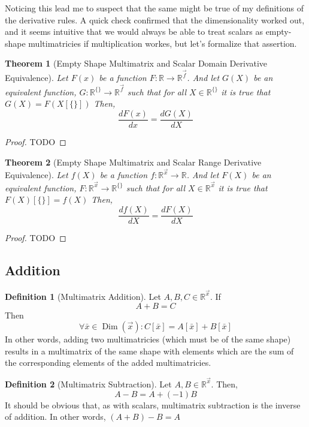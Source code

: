 \documentclass[12pt]{article}
\theoremstyle{definition}
\newtheorem{definition}{Definition}[section]
\theoremstyle{plain}
\newtheorem{theorem}{Theorem}[section]
\theoremstyle{ppart}
\DeclareMathOperator{\Dim}{Dim}
\begin{document}
Noticing this lead me to suspect that the same might be true of my definitions
of the derivative rules. A quick check confirmed that the dimensionality
worked out, and it seems intuitive that we would always be able to treat scalars
as empty-shape multimatricies if multiplication workes, but let's formalize that
assertion.

\begin{theorem}[Empty Shape Multimatrix and Scalar Domain Derivative Equivalence]
\label{s_mm_domain_equiv}
Let $F(x)$ be a function $F : \mathbb{R} \to \mathbb{R}^{\vec{f}}$. And let
$G(X)$ be an equivalent function, $G : \mathbb{R}^{\{\}} \to \mathbb{R}^{\vec{f}}$
such that for all $X \in \mathbb{R}^{\{\}}$ it is true that $G(X) = F(X[\{\}])$
Then,
\[ \frac{dF(x)}{dx} = \frac{dG(X)}{dX} \]
\end{theorem}
\begin{proof}
TODO
\end{proof}

\begin{theorem}[Empty Shape Multimatrix and Scalar Range Derivative Equivalence]
\label{s_mm_range_equiv}
Let $f(X)$ be a function $f : \mathbb{R}^{\vec{x}} \to \mathbb{R}$. And let
$F(X)$ be an equivalent function, $F : \mathbb{R}^{\vec{x}} \to \mathbb{R}^{\{\}}$
such that for all $X \in \mathbb{R}^{\vec{x}}$ it is true that $F(X)[\{\}] = f(X)$
Then,
\[ \frac{df(X)}{dX} = \frac{dF(X)}{dX} \]
\end{theorem}
\begin{proof}
TODO
\end{proof}

\subsection{Addition}

\begin{definition}[Multimatrix Addition]
Let $A, B, C \in \mathbb{R}^{\vec{x}}$. If
\[ A + B = C \]
Then
\[ \forall \bar{x} \in \Dim(\vec{x}):
   C[\bar{x}] = A[\bar{x}] + B[\bar{x}] \]
In other words, adding two multimatricies (which must be of the same shape) results
in a multimatrix of the same shape with elements which are the sum of the corresponding
elements of the added multimatricies.
\end{definition}

\begin{definition}[Multimatrix Subtraction]
Let $A, B \in \mathbb{R}^{\vec{x}}$. Then,
\[ A - B = A + (-1)B \]
It should be obvious that, as with scalars, multimatrix subtraction is the
inverse of addition. In other words, $(A + B) - B = A$
\end{definition}
\end{document}
